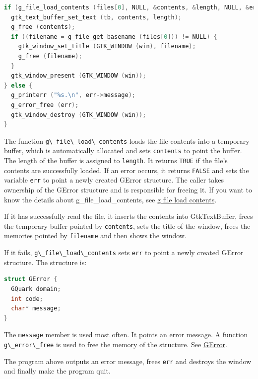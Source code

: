 \begin{lstlisting}[language=C]
if (g_file_load_contents (files[0], NULL, &contents, &length, NULL, &err)) {
  gtk_text_buffer_set_text (tb, contents, length);
  g_free (contents);
  if ((filename = g_file_get_basename (files[0])) != NULL) {
    gtk_window_set_title (GTK_WINDOW (win), filename);
    g_free (filename);
  }
  gtk_window_present (GTK_WINDOW (win));
} else {
  g_printerr ("%s.\n", err->message);
  g_error_free (err);
  gtk_window_destroy (GTK_WINDOW (win));
}
\end{lstlisting}

The function \passthrough{\lstinline!g\_file\_load\_contents!} loads the
file contents into a temporary buffer, which is automatically allocated
and sets \passthrough{\lstinline!contents!} to point the buffer. The
length of the buffer is assigned to \passthrough{\lstinline!length!}. It
returns \passthrough{\lstinline!TRUE!} if the file's contents are
successfully loaded. If an error occurs, it returns
\passthrough{\lstinline!FALSE!} and sets the variable
\passthrough{\lstinline!err!} to point a newly created GError structure.
The caller takes ownership of the GError structure and is responsible
for freeing it. If you want to know the details about
g\_file\_load\_contents, see
\href{https://docs.gtk.org/gio/method.File.load_contents.html}{g file
load contents}.

If it has successfully read the file, it inserts the contents into
GtkTextBuffer, frees the temporary buffer pointed by
\passthrough{\lstinline!contents!}, sets the title of the window, frees
the memories pointed by \passthrough{\lstinline!filename!} and then
shows the window.

If it fails, \passthrough{\lstinline!g\_file\_load\_contents!} sets
\passthrough{\lstinline!err!} to point a newly created GError structure.
The structure is:

\begin{lstlisting}[language=C]
struct GError {
  GQuark domain;
  int code;
  char* message;
}
\end{lstlisting}

The \passthrough{\lstinline!message!} member is used most often. It
points an error message. A function
\passthrough{\lstinline!g\_error\_free!} is used to free the memory of
the structure. See
\href{https://docs.gtk.org/glib/struct.Error.html}{GError}.

The program above outputs an error message, frees
\passthrough{\lstinline!err!} and destroys the window and finally make
the program quit.

